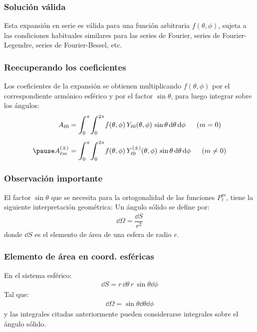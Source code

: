 \documentclass[12pt]{beamer}
\begin{document}
\begin{frame}
\frametitle{Solución válida}
Esta expansión en serie es válida para una función arbitraria $f (\theta, \phi)$, sujeta a las condiciones habituales similares para las series de Fourier, series de Fourier-Legendre, series de Fourier-Bessel, etc.
\end{frame}
\begin{frame}
\frametitle{Reecuperando los coeficientes}
Los coeficientes de la expansión se obtienen multiplicando $f (\theta, \phi)$ por el correspondiente armónico esférico y por el factor $\sin \theta$, para luego integrar sobre los ángulos:
\pause
\begin{eqnarray*}
\begin{aligned}
A_{\ell 0} &= \scaleint{6ex}_{\bs 0}^{\pi} \scaleint{6ex}_{\bs 0}^{2 \pi} f (\theta, \phi) \, Y_{\ell 0} (\theta, \phi) \, \sin \theta \dd{\theta} \dd{\phi} \hspace{0.5cm} (m = 0) \\[0.5em] \pause
A_{\ell m}^{(\pm)} &= \scaleint{6ex}_{\bs 0}^{\pi} \scaleint{6ex}_{\bs 0}^{2 \pi} f (\theta, \phi) \, Y_{\ell 0}^{(\pm)} (\theta, \phi) \, \sin \theta \dd{\theta} \dd{\phi} \hspace{0.5cm} (m \neq 0)
\end{aligned}
\end{eqnarray*}
\end{frame}
\begin{frame}
\frametitle{Observación importante}
El factor $\sin \theta$ que se necesita para la ortogonalidad de las funciones $P_{\ell}^{m}$, tiene la siguiente interpretación geométrica: Un ángulo sólido se define por:
\pause
\begin{align*}
\dd{\Omega} = \dfrac{\dd{S}}{r^{2}}
\end{align*}
donde $\dd{S}$ es el elemento de área de una esfera de radio $r$.
\end{frame}
\begin{frame}
\frametitle{Elemento de área en coord. esféricas}
En el sistema esférico:
\pause
\begin{align*}
\dd{S} = r \, \dd{\theta} \, r \, \sin \theta \dd{\phi}
\end{align*}
\pause
Tal que:
\pause
\begin{align*}
\dd{\Omega} = \sin \theta \dd{\theta} \dd{\phi}
\end{align*}
y las integrales citadas anteriormente pueden considerarse integrales sobre el ángulo sólido.
\end{frame}
\end{document}
